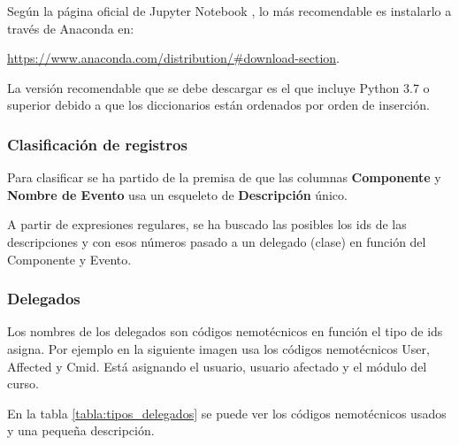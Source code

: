 Según la página oficial de Jupyter Notebook \cite{noauthor_project_nodate}, lo más recomendable es instalarlo a través de Anaconda en:

\href{https://www.anaconda.com/distribution/\#download-section}{https://www.anaconda.com/distribution/\#download-section}.

La versión recomendable que se debe descargar es el que incluye Python 3.7 o superior debido a que los diccionarios están ordenados por orden de inserción.

\subsubsection{Clasificación de registros}

Para clasificar se ha partido de la premisa de que las columnas \textbf{Componente} y \textbf{Nombre de Evento} usa un esqueleto de \textbf{Descripción} único. 

A partir de expresiones regulares, se ha buscado las posibles los ids de las descripciones y con esos números pasado a un delegado (clase) en función del Componente y Evento. 


\subsubsection{Delegados}

Los nombres de los delegados son códigos nemotécnicos en función el tipo de ids asigna. Por ejemplo en la siguiente imagen usa los códigos nemotécnicos User, Affected y Cmid. Está asignando el usuario, usuario afectado y el módulo del curso.

En la tabla \ref{tabla:tipos_delegados} se puede ver los códigos nemotécnicos usados y una pequeña descripción.


